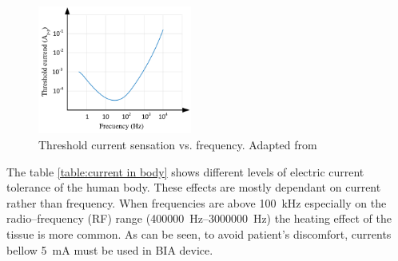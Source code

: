 \begin{figure}[!htpb]
	\centering
	\includegraphics[width=0.45\textwidth,keepaspectratio]{figure14}    
	\caption[Threshold current sensation vs. frequency]{Threshold current sensation vs. frequency. Adapted from \cite{brown1998medical}}
	\label{fig:threshold sensation}
\end{figure}

The table \ref{table:current in body} shows different levels of electric current tolerance of the human body. These effects are mostly dependant on current rather than frequency. When frequencies are above \SI{100}{\kilo\hertz} especially on the radio–frequency (RF) range (\SIrange[scientific-notation = engineering]{400000}{3000000}{\hertz}) the heating effect of the tissue is more common. As can be seen, to avoid patient’s discomfort, currents bellow \SI{5}{\milli\ampere} must be used in BIA device.

